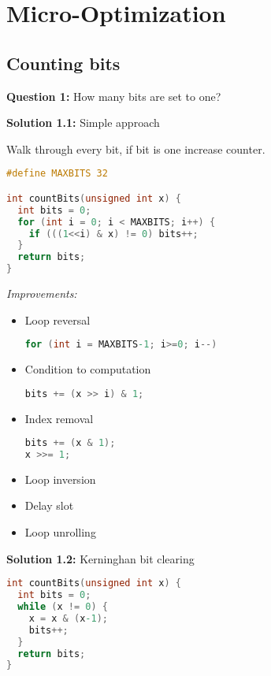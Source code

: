 \chapter{Micro-Optimization} \label{CHAP:MOPT}

\section{Counting bits}

\textbf{Question 1:} How many bits are set to one?

\textbf{Solution 1.1:} Simple approach 

Walk through every bit, if bit is one increase counter.

\begin{lstlisting}[language=C]
#define MAXBITS 32

int countBits(unsigned int x) { 
  int bits = 0; 
  for (int i = 0; i < MAXBITS; i++) { 
    if (((1<<i) & x) != 0) bits++; 
  } 
  return bits; 
}
\end{lstlisting}

\textit{Improvements:}

\begin{itemize}
\item Loop reversal
\begin{lstlisting}[language=C]
for (int i = MAXBITS-1; i>=0; i--)
\end{lstlisting}

\item Condition to computation
\begin{lstlisting}[language=C]
bits += (x >> i) & 1; 
\end{lstlisting}

\item Index removal
\begin{lstlisting}[language=C]
bits += (x & 1); 
x >>= 1; 
\end{lstlisting}

\item Loop inversion

\item Delay slot

\item Loop unrolling
\end{itemize}





\textbf{Solution 1.2:} Kerninghan bit clearing

\begin{lstlisting}[language=C]
int countBits(unsigned int x) { 
  int bits = 0; 
  while (x != 0) { 
    x = x & (x-1); 
    bits++; 
  } 
  return bits; 
}
\end{lstlisting}

